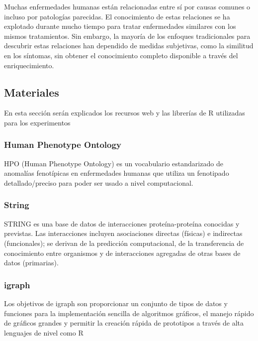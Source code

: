 \hfill

Muchas enfermedades humanas están relacionadas \cite{Enriquecimiento2} entre sí por causas comunes o incluso por patologías parecidas. El conocimiento de estas relaciones se ha explotado durante mucho tiempo para tratar enfermedades similares con los mismos tratamientos. Sin embargo, la mayoría de los enfoques tradicionales para descubrir estas relaciones han dependido de medidas subjetivas, como la similitud en los síntomas, sin obtener el conocimiento completo disponible a través del enriquecimiento.


\subsection{Materiales}

En esta sección serán explicados los recursos web y las librerías de R utilizadas para los experimentos

\subsubsection{Human Phenotype Ontology}

HPO (Human Phenotype Ontology)\cite{HPO_paper} es un vocabulario estandarizado de anomalías fenotípicas en enfermedades humanas que utiliza un fenotipado detallado/preciso para poder ser usado a nivel computacional.

\hfill

\subsubsection{String}

STRING \cite{String_paper} es una base de datos de interacciones proteína-proteína conocidas y previstas. Las interacciones incluyen asociaciones directas (físicas) e indirectas (funcionales); se derivan de la predicción computacional, de la transferencia de conocimiento entre organismos y de interacciones agregadas de otras bases de datos (primarias).

\subsubsection{igraph}

Los objetivos de igraph son proporcionar un conjunto de tipos de datos y funciones para la implementación sencilla de algoritmos gráficos, el manejo rápido de gráficos grandes y permitir la creación rápida de prototipos a través de alta lenguajes de nivel como R

